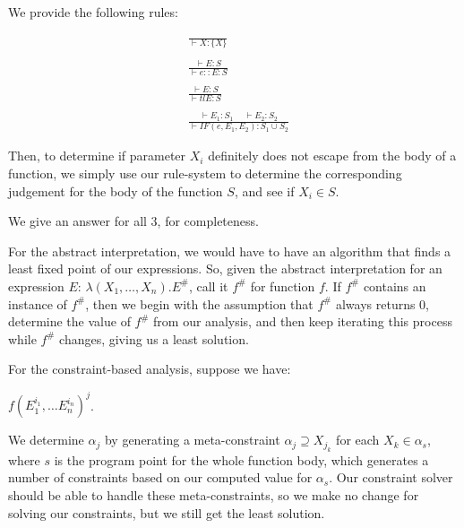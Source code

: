 \begin{enumerate}[label=(\alph*)]
  We provide the following rules:

  \begin{align*}
    &\frac{}{\vdash X : \{X\}}\\
    \\
    &\frac{\vdash E : S}{\vdash e::E : S}\\
    \\
    &\frac{\vdash E : S}{\vdash tl E : S}\\
    \\
    &\frac{\vdash E_1 : S_1 \hspace{15pt} \vdash E_2 : S_2}{\vdash IF(e, E_1, E_2) : S_1 \cup S_2}
  \end{align*}

  Then, to determine if parameter $X_i$ definitely does not escape from the body of a function, we simply use our rule-system to determine the corresponding judgement for the body of the function $S$, and see if $X_i \in S$.
    \end{enumerate}

  \item
    We give an answer for all 3, for completeness.

    For the abstract interpretation, we would have to have an algorithm that finds a least fixed point of our expressions. So, given the abstract interpretation for an expression $E$: $\lambda (X_1, \ldots, X_n). E^{\#}$, call it $f^{\#}$ for function $f$. If $f^{\#}$ contains an instance of $f^{\#}$, then we begin with the assumption that $f^{\#}$ always returns 0, determine the value of $f^{\#}$ from our analysis, and then keep iterating this process while $f^{\#}$ changes, giving us a least solution.

    For the constraint-based analysis, suppose we have:

    $f(E_1^{i_1}, \ldots E_n^{i_n})^j$.

  We determine $\alpha_j$ by generating a meta-constraint $\alpha_j \supseteq X_{j_k}$ for each $X_k \in \alpha_s$, where $s$ is the program point for the whole function body, which generates a number of constraints based on our computed value for $\alpha_s$. Our constraint solver should be able to handle these meta-constraints, so we make no change for solving our constraints, but we still get the least solution.


